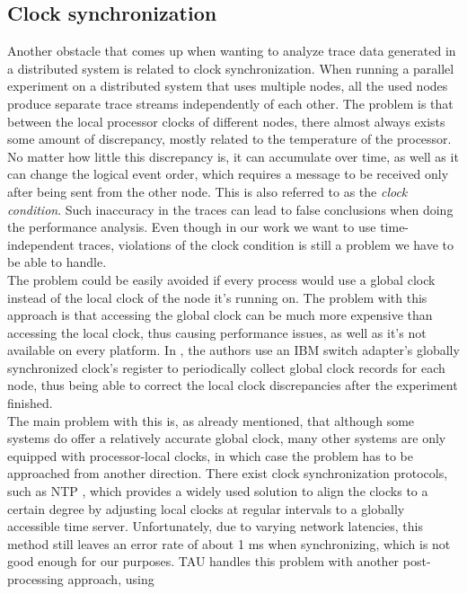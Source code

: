 \subsection{Clock synchronization}
\label{sec:clock_synch}
Another obstacle that comes up when wanting to analyze trace data
generated in a distributed system is related to clock
synchronization. When running a parallel experiment on a distributed
system that uses multiple nodes, all the used nodes produce separate
trace streams independently of each other. The problem is that between
the local processor clocks of different nodes, there almost always exists
some amount of discrepancy, mostly related to the temperature
of the processor. No matter how little this discrepancy is,
it can accumulate over time, as well as it can change the logical
event order, which requires a message to be received only after being
sent from the other node. This is also referred to as the \emph{clock
condition}.\cite{wbswpclg00}\cite{brwl09} Such inaccuracy in the traces
can lead to false conclusions when doing the performance
analysis. Even though in our work we want to use time-independent
traces, violations of the clock condition is still a problem we have
to be able to handle.\\[0.3cm]
The problem could be easily avoided if every process would use a
global clock instead of the local clock of the node it's running
on. The problem with this approach is that accessing the global clock
can be much more expensive than accessing the local clock, thus
causing performance issues, as well as it's not available on every
platform. In \cite{wbswpclg00}, the authors use an IBM switch
adapter's globally synchronized clock's register to periodically
collect global clock records for each node, thus being able to correct
the local clock discrepancies after the experiment finished.\\[0.3cm]
The main problem with this is, as already mentioned, that although
some systems do offer a relatively
accurate global clock, many other systems are only equipped with
processor-local clocks, in which case the problem has to be approached
from another direction. There exist clock synchronization protocols,
such as NTP \cite{m92}, which provides a widely used solution to align
the clocks to a certain degree by adjusting local clocks at regular
intervals to a globally accessible time server. Unfortunately, due to
varying network latencies, this method still leaves an error rate
of about 1 ms when synchronizing, which is not good enough for our
purposes.
TAU handles this problem with another post-processing approach, using
